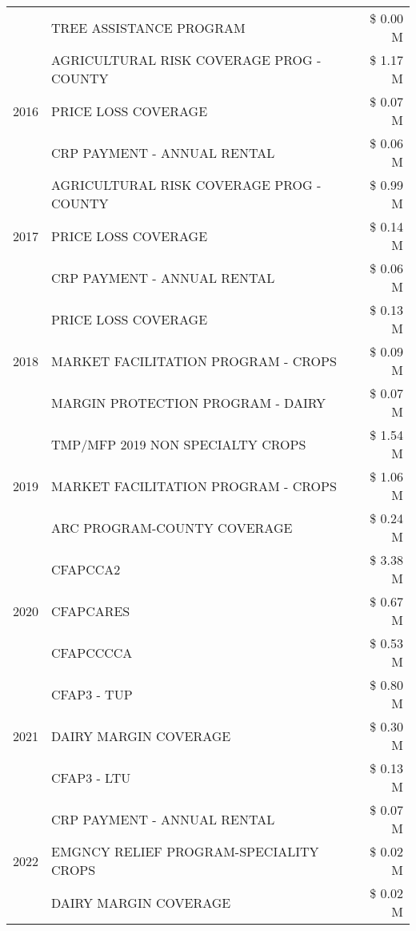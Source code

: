 \begin{tabular}{llr}
 & TREE ASSISTANCE PROGRAM & \$ 0.00 M \\
\cline{1-3}
\multirow[t]{3}{*}{2016} & AGRICULTURAL RISK COVERAGE PROG - COUNTY & \$ 1.17 M \\
 & PRICE LOSS COVERAGE & \$ 0.07 M \\
 & CRP PAYMENT - ANNUAL RENTAL & \$ 0.06 M \\
\cline{1-3}
\multirow[t]{3}{*}{2017} & AGRICULTURAL RISK COVERAGE PROG - COUNTY & \$ 0.99 M \\
 & PRICE LOSS COVERAGE & \$ 0.14 M \\
 & CRP PAYMENT - ANNUAL RENTAL & \$ 0.06 M \\
\cline{1-3}
\multirow[t]{3}{*}{2018} & PRICE LOSS COVERAGE & \$ 0.13 M \\
 & MARKET FACILITATION PROGRAM - CROPS & \$ 0.09 M \\
 & MARGIN PROTECTION PROGRAM - DAIRY & \$ 0.07 M \\
\cline{1-3}
\multirow[t]{3}{*}{2019} & TMP/MFP 2019 NON SPECIALTY CROPS & \$ 1.54 M \\
 & MARKET FACILITATION PROGRAM - CROPS & \$ 1.06 M \\
 & ARC PROGRAM-COUNTY COVERAGE & \$ 0.24 M \\
\cline{1-3}
\multirow[t]{3}{*}{2020} & CFAPCCA2 & \$ 3.38 M \\
 & CFAPCARES & \$ 0.67 M \\
 & CFAPCCCCA & \$ 0.53 M \\
\cline{1-3}
\multirow[t]{3}{*}{2021} & CFAP3 - TUP & \$ 0.80 M \\
 & DAIRY MARGIN COVERAGE & \$ 0.30 M \\
 & CFAP3 - LTU & \$ 0.13 M \\
\cline{1-3}
\multirow[t]{3}{*}{2022} & CRP PAYMENT - ANNUAL RENTAL & \$ 0.07 M \\
 & EMGNCY RELIEF PROGRAM-SPECIALITY CROPS & \$ 0.02 M \\
 & DAIRY MARGIN COVERAGE & \$ 0.02 M \\
\cline{1-3}
\bottomrule
\end{tabular}
